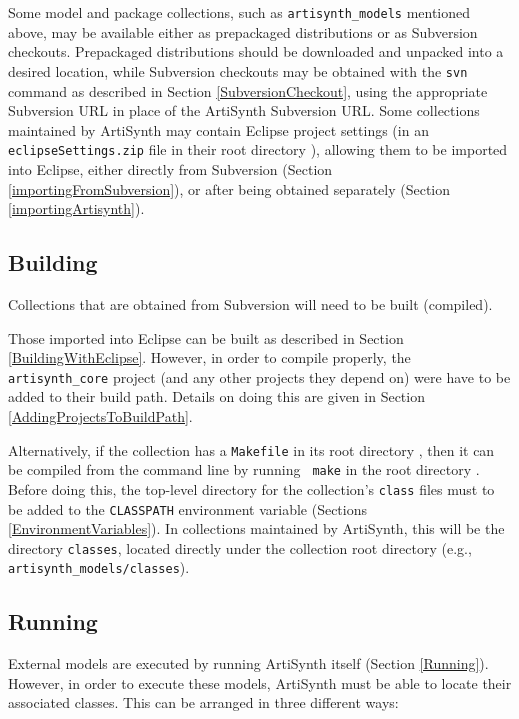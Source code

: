\documentclass{article}
\def\SEP{/}
\def\directory{directory }
\begin{document}
Some model and package collections, such as {\tt artisynth\_models}
mentioned above, may be available either as prepackaged distributions
or as Subversion checkouts. Prepackaged distributions should be
downloaded and unpacked into a desired location, while Subversion
checkouts may be obtained with the {\tt svn} command as
described in Section \ref{SubversionCheckout}, using the
appropriate Subversion URL in place of the ArtiSynth Subversion URL. Some
collections maintained by ArtiSynth may contain Eclipse project
settings (in an {\tt eclipseSettings.zip} file in their root
\directory), allowing them to be imported into Eclipse, either
directly from Subversion (Section \ref{importingFromSubversion}), or
after being obtained separately (Section \ref{importingArtisynth}).

\subsection{Building}

Collections that are obtained from Subversion will need to be built
(compiled).

Those imported into Eclipse can be built as described in Section
\ref{BuildingWithEclipse}. However, in order to compile properly, the
{\tt artisynth\_core} project (and any other projects they depend on)
were have to be added to their build path. Details on doing this are
given in Section \ref{AddingProjectsToBuildPath}.

Alternatively, if the collection has a {\tt Makefile} in its root
\directory, then it can be compiled from the command line by running {\tt
make} in the root \directory. Before doing this, the top-level
\directory for the collection's {\tt class} files must to be added to
the {\tt CLASSPATH} environment variable (Sections
\ref{EnvironmentVariables}). In collections maintained by ArtiSynth,
this will be the \directory {\tt classes}, located directly under the
collection root \directory (e.g., {\tt artisynth\_models\SEP classes}).



\subsection{Running}

External models are executed by running ArtiSynth itself (Section
\ref{Running}). However, in order to execute these models, ArtiSynth
must be able to locate their associated classes. This can be
arranged in three different ways:
\end{document}
